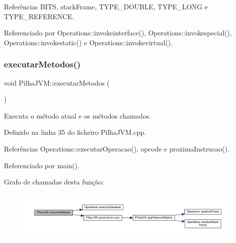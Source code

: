 Referências B\+I\+TS, stack\+Frame, T\+Y\+P\+E\+\_\+\+D\+O\+U\+B\+LE, T\+Y\+P\+E\+\_\+\+L\+O\+NG e T\+Y\+P\+E\+\_\+\+R\+E\+F\+E\+R\+E\+N\+CE.



Referenciado por Operations\+::invokeinterface(), Operations\+::invokespecial(), Operations\+::invokestatic() e Operations\+::invokevirtual().

\mbox{\label{classPilhaJVM_a8c87f8255b289be137dd09360d135e86}} 
\subsubsection{\texorpdfstring{executar\+Metodos()}{executarMetodos()}}
{\footnotesize\ttfamily void Pilha\+J\+V\+M\+::executar\+Metodos (\begin{DoxyParamCaption}{ }\end{DoxyParamCaption})}



Executa o método atual e os métodos chamados. 



Definido na linha 35 do ficheiro Pilha\+J\+V\+M.\+cpp.



Referências Operations\+::executar\+Operacao(), opcode e proxima\+Instrucao().



Referenciado por main().

Grafo de chamadas desta função\+:
\nopagebreak
\begin{figure}[H]
\begin{center}
\leavevmode
\includegraphics[width=350pt]{classPilhaJVM_a8c87f8255b289be137dd09360d135e86_cgraph}
\end{center}
\end{figure}
\mbox{\label{classPilhaJVM_a08adb78983b512cf3d97becfa2e9a5f0}} 
